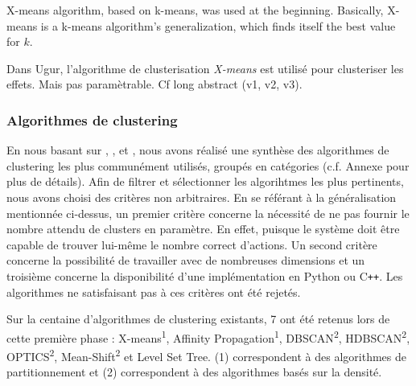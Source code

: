 \documentclass{llncs}
\begin{document}
X-means algorithm\cite{Pelleg:2000:XEK:645529.657808}, based on k-means, was used at the beginning. Basically, X-means is a k-means algorithm's generalization, which finds itself the best value for $k$.




Dans Ugur, l'algorithme de clusterisation \textit{X-means} est utilisé pour clusteriser les effets. Mais pas paramètrable. Cf long abstract (v1, v2, v3).

%



\subsubsection{Algorithmes de clustering}

En nous basant sur \cite{Xu2015}, \cite{Andreopoulos2009}, \cite{Fahad2014} et \cite{Sajana2016}, nous avons réalisé une synthèse des algorithmes de clustering les plus communément utilisés, groupés en catégories (c.f. Annexe pour plus de détails). Afin de filtrer et sélectionner les algorihtmes les plus pertinents, nous avons choisi des critères non arbitraires. En se référant à la généralisation mentionnée ci-dessus, un premier critère concerne la nécessité de ne pas fournir le nombre attendu de clusters en paramètre. En effet, puisque le système doit être capable de trouver lui-même le nombre correct d'actions. Un second critère concerne la possibilité de travailler avec de nombreuses dimensions et un troisième concerne la disponibilité d'une implémentation en Python ou C{}\verb!++!. Les algorithmes ne satisfaisant pas à ces critères ont été rejetés.

Sur la centaine d'algorithmes de clustering existants, 7 ont été retenus lors de cette première phase : X-means\textsuperscript{1}, Affinity Propagation\textsuperscript{1}, DBSCAN\textsuperscript{2}, HDBSCAN\textsuperscript{2}, OPTICS\textsuperscript{2}, Mean-Shift\textsuperscript{2} et Level Set Tree. (1) correspondent à des algorithmes de partitionnement et (2) correspondent à des algorithmes basés sur la densité.
\end{document}

